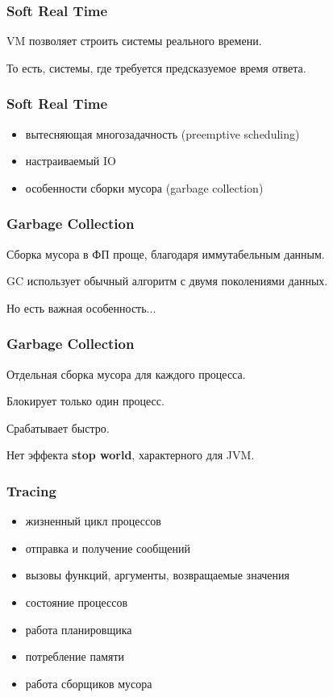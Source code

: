 \documentclass[10pt]{beamer}
\begin{document}
\begin{frame}
\frametitle{Soft Real Time}
\centering
VM позволяет строить системы реального времени.
\par \bigskip
То есть, системы, где требуется предсказуемое время ответа.
\end{frame}

\begin{frame}
\frametitle{Soft Real Time}
\begin{itemize}
\item вытесняющая многозадачность (preemptive scheduling)
\item настраиваемый IO
\item особенности сборки мусора (garbage collection)
\end{itemize}
\end{frame}

\begin{frame}
\frametitle{Garbage Collection}
\centering
Сборка мусора в ФП проще, благодаря иммутабельным данным.
\par \bigskip
GC использует обычный алгоритм с двумя поколениями данных.
\par \bigskip
Но есть важная особенность...
\end{frame}

\begin{frame}
\frametitle{Garbage Collection}
\centering
Отдельная сборка мусора для каждого процесса.
\par \bigskip
Блокирует только один процесс.
\par \bigskip
Срабатывает быстро.
\par \bigskip
Нет эффекта \textbf{stop world}, характерного для JVM.
\end{frame}

\begin{frame}
\frametitle{Tracing}
\begin{itemize}
\item жизненный цикл процессов
\item отправка и получение сообщений
\item вызовы функций, аргументы, возвращаемые значения
\item состояние процессов
\item работа планировщика
\item потребление памяти
\item работа сборщиков мусора
\end{itemize}
\end{frame}
\end{document}
